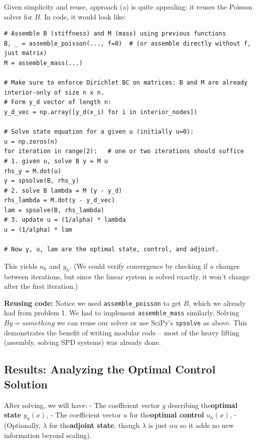 \documentclass[a4paper,10pt]{article}
\begin{document}
Given simplicity and reuse, approach (a) is quite appealing: it reuses the Poisson solver for \(B\). In code, it would look like:

\begin{verbatim}
# Assemble B (stiffness) and M (mass) using previous functions
B, _ = assemble_poisson(..., f=0)  # (or assemble directly without f, just matrix)
M = assemble_mass(...)

# Make sure to enforce Dirichlet BC on matrices: B and M are already interior-only of size n x n.
# Form y_d vector of length n:
y_d_vec = np.array([y_d(x_i) for i in interior_nodes])

# Solve state equation for a given u (initially u=0):
u = np.zeros(n)
for iteration in range(2):   # one or two iterations should suffice
# 1. given u, solve B y = M u
rhs_y = M.dot(u)
y = spsolve(B, rhs_y)
# 2. solve B lambda = M (y - y_d)
rhs_lambda = M.dot(y - y_d_vec)
lam = spsolve(B, rhs_lambda)
# 3. update u = (1/alpha) * lambda
u = (1/alpha) * lam

# Now y, u, lam are the optimal state, control, and adjoint.
\end{verbatim}

This yields \(u_h\) and \(y_h\). (We could verify convergence by checking if \(u\) changes between iterations, but since the linear system is solved exactly, it won't change after the first iteration.)

\textbf{Reusing code:} Notice we used \texttt{assemble_poisson} to get \(B\), which we already had from problem 1. We had to implement \texttt{assemble_mass} similarly. Solving \(B y = something\) we can reuse our solver or use SciPy's \texttt{spsolve} as above.
This demonstrates the benefit of writing modular code -- most of the heavy lifting (assembly, solving SPD systems) was already done.

\subsection{Results: Analyzing the Optimal Control Solution}
After solving, we will have:
- The coefficient vector \(y\) describing the\textbf{optimal state} \(y_h(x)\),
- The coefficient vector \(u\) for the\textbf{optimal control} \(u_h(x)\),
- (Optionally, \(\lambda\) for the\textbf{adjoint state}, though \(\lambda\) is just \(\alpha u\) so it adds no new information beyond scaling).
\end{document}
